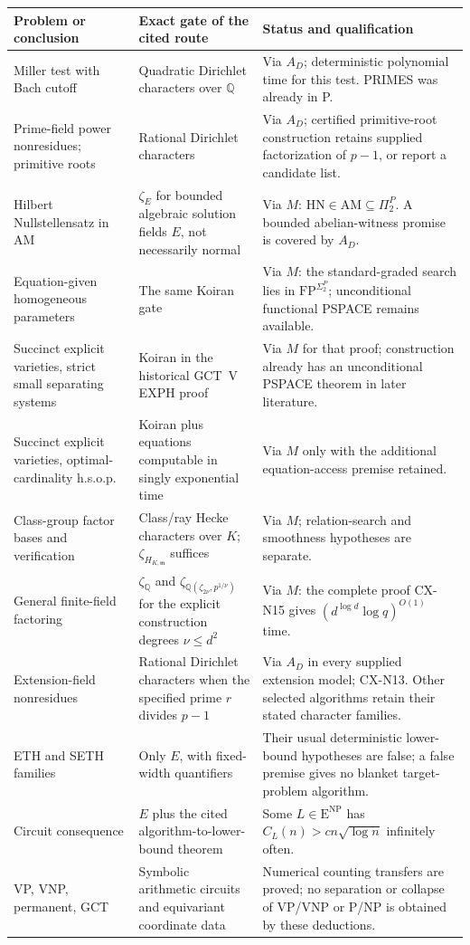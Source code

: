 \documentclass[11pt,a4paper]{article}
\begin{document}
\begin{longtable}{@{}p{}p{}p{}@{}}
\toprule
Problem or conclusion & Exact gate of the cited route & Status and qualification\\
\midrule
\endhead
Miller test with Bach cutoff & Quadratic Dirichlet characters over $\mathbb Q$ & Via $A_D$; deterministic polynomial time for this test. PRIMES was already in P.\\
Prime-field power nonresidues; primitive roots & Rational Dirichlet characters & Via $A_D$; certified primitive-root construction retains supplied factorization of $p-1$, or report a candidate list.\\
Hilbert Nullstellensatz in AM & $\zeta_E$ for bounded algebraic solution fields $E$, not necessarily normal & Via $M$: $\mathrm{HN}\in\mathrm{AM}\subseteq\Pi_2^P$. A bounded abelian-witness promise is covered by $A_D$.\\
Equation-given homogeneous parameters & The same Koiran gate & Via $M$: the standard-graded search lies in $\mathrm{FP}^{\Sigma_2^P}$; unconditional functional PSPACE remains available.\\
Succinct explicit varieties, strict small separating systems & Koiran in the historical GCT~V EXPH proof & Via $M$ for that proof; construction already has an unconditional PSPACE theorem in later literature.\\
Succinct explicit varieties, optimal-cardinality h.s.o.p. & Koiran plus equations computable in singly exponential time & Via $M$ only with the additional equation-access premise retained.\\
Class-group factor bases and verification & Class/ray Hecke characters over $K$; $\zeta_{H_{K,\mathfrak m}}$ suffices & Via $M$; relation-search and smoothness hypotheses are separate.\\
General finite-field factoring & $\zeta_{\mathbb Q}$ and $\zeta_{\mathbb Q(\zeta_{2\nu},p^{1/\nu})}$ for the explicit construction degrees $\nu\le d^2$ & Via $M$: the complete proof CX-N15 gives $(d^{\log d}\log q)^{O(1)}$ time.\\
Extension-field nonresidues & Rational Dirichlet characters when the specified prime $r$ divides $p-1$ & Via $A_D$ in every supplied extension model; CX-N13. Other selected algorithms retain their stated character families.\\
ETH and SETH families & Only $E$, with fixed-width quantifiers & Their usual deterministic lower-bound hypotheses are false; a false premise gives no blanket target-problem algorithm.\\
Circuit consequence & $E$ plus the cited algorithm-to-lower-bound theorem & Some $L\in\mathrm E^{\mathrm{NP}}$ has $C_L(n)>c n\sqrt{\log n}$ infinitely often.\\
VP, VNP, permanent, GCT & Symbolic arithmetic circuits and equivariant coordinate data & Numerical counting transfers are proved; no separation or collapse of VP/VNP or P/NP is obtained by these deductions.\\
\bottomrule
\end{longtable}
\end{document}
